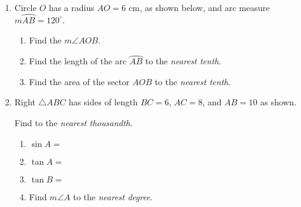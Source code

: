 \documentclass[12pt, twoside]{article}
\begin{document}
\begin{enumerate}
   \item Circle $O$ has a radius $AO=6$ cm, as shown below, and arc measure $m \wideparen{AB}=120^\circ$.
      \begin{multicols}{2}
      \columnbreak
        \begin{enumerate}
          \item Find the $m \angle AOB$. \vspace{1cm}
          \item Find the length of the arc $\wideparen{AB}$ to the \emph{nearest tenth}. \vspace{3cm}
          \item Find the area of the sector $AOB$ to the \emph{nearest tenth}. %
        \end{enumerate}
      \end{multicols}


 \newpage
 \raggedcolumns
   \item Right $\triangle ABC$ has sides of length $BC=6$, $AC=8$, and $AB=10$ as shown. %
   \begin{multicols}{2}
             Find to the \emph{nearest thousandth}.
         \begin{enumerate}
           \item $\sin A =$ \vspace{1cm}
           \item $\tan A =$ \vspace{1cm}
           \item $\tan B =$ \vspace{1cm}
           \item Find $m\angle A$ to the \emph{nearest degree}. \vspace{1cm}
       \end{enumerate}
     \end{multicols} \vspace{1cm}


\end{enumerate}
\end{document}
